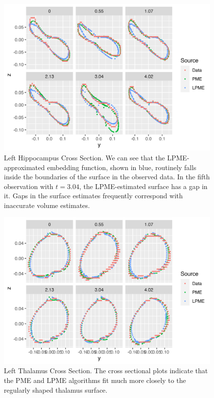 \documentclass[11pt,reqno]{article}
\theoremstyle{definition}
\begin{document}
\begin{figure}[h]
  \centering
  \includegraphics[height=8cm]{adni_plots/adni_cross_section}
  \caption{Left Hippocampus Cross Section. We can see that the LPME-approximated embedding function, shown in blue, routinely falls inside the boundaries of the surface in the observed data. In the fifth observation with $t=3.04$, the LPME-estimated surface has a gap in it. Gaps in the surface estimates frequently correspond with inaccurate volume estimates.}
  \label{fig:lhipp_cross_sections}
\end{figure}

\begin{figure}[h]
  \centering
  \includegraphics[height=8cm]{adni_plots/adni_lthal_cross_section}
  \caption{Left Thalamus Cross Section. The cross sectional plots indicate that the PME and LPME algorithms fit much more closely to the regularly shaped thalamus surface.}
  \label{fig:lthal_cross_sections}
\end{figure}
\end{document}
